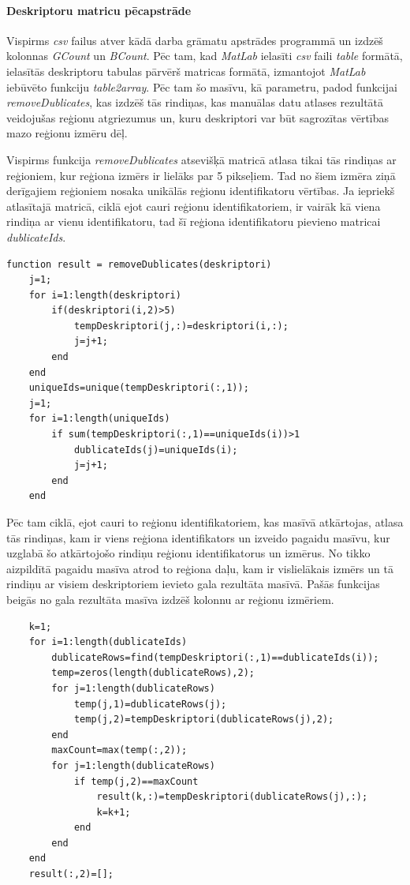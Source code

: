 \documentclass[12pt,paper=a4]{report}
\begin{document}
\paragraph{Deskriptoru matricu pēcapstrāde}Vispirms \textit{csv} failus atver kādā darba grāmatu apstrādes programmā un izdzēš kolonnas \textit{GCount} un \textit{BCount}. Pēc tam, kad \textit{MatLab} ielasīti \textit{csv} faili \textit{table} formātā, ielasītās deskriptoru tabulas pārvērš matricas formātā, izmantojot \textit{MatLab} iebūvēto funkciju \textit{table2array}. Pēc tam šo masīvu, kā parametru, padod funkcijai \textit{removeDublicates}, kas izdzēš tās rindiņas, kas manuālas datu atlases rezultātā veidojušas reģionu atgriezumus un, kuru deskriptori var būt sagrozītas vērtības mazo reģionu izmēru dēļ.\par 
Vispirms funkcija \textit{removeDublicates} atsevišķā matricā atlasa tikai tās rindiņas ar reģioniem, kur reģiona izmērs ir lielāks par 5 pikseļiem. Tad no šiem izmēra ziņā derīgajiem reģioniem nosaka unikālās reģionu identifikatoru vērtības. Ja iepriekš atlasītajā matricā, ciklā ejot cauri reģionu identifikatoriem, ir vairāk kā viena rindiņa ar vienu identifikatoru, tad šī reģiona identifikatoru pievieno matricai \textit{dublicateIds}.
\begin{lstlisting}
function result = removeDublicates(deskriptori)
	j=1;
	for i=1:length(deskriptori)
   		if(deskriptori(i,2)>5)
       		tempDeskriptori(j,:)=deskriptori(i,:);
       		j=j+1;
   		end
	end
	uniqueIds=unique(tempDeskriptori(:,1));
	j=1;
	for i=1:length(uniqueIds)
    	if sum(tempDeskriptori(:,1)==uniqueIds(i))>1
        	dublicateIds(j)=uniqueIds(i);
        	j=j+1;
    	end
	end
\end{lstlisting}
Pēc tam ciklā, ejot cauri to reģionu identifikatoriem, kas masīvā atkārtojas, atlasa tās rindiņas, kam ir viens reģiona identifikators un izveido pagaidu masīvu, kur uzglabā šo atkārtojošo rindiņu reģionu identifikatorus un izmērus. No tikko aizpildītā pagaidu masīva atrod to reģiona daļu, kam ir vislielākais izmērs un tā rindiņu ar visiem deskriptoriem ievieto gala rezultāta masīvā. Pašās funkcijas beigās no gala rezultāta masīva izdzēš kolonnu ar reģionu izmēriem.
\begin{lstlisting}
	k=1;
	for i=1:length(dublicateIds)
    	dublicateRows=find(tempDeskriptori(:,1)==dublicateIds(i));
    	temp=zeros(length(dublicateRows),2);
    	for j=1:length(dublicateRows)
        	temp(j,1)=dublicateRows(j);
        	temp(j,2)=tempDeskriptori(dublicateRows(j),2);
    	end
    	maxCount=max(temp(:,2));
    	for j=1:length(dublicateRows)
        	if temp(j,2)==maxCount
            	result(k,:)=tempDeskriptori(dublicateRows(j),:);
            	k=k+1;
        	end
    	end
	end
	result(:,2)=[];
\end{lstlisting}\par
\end{document}

